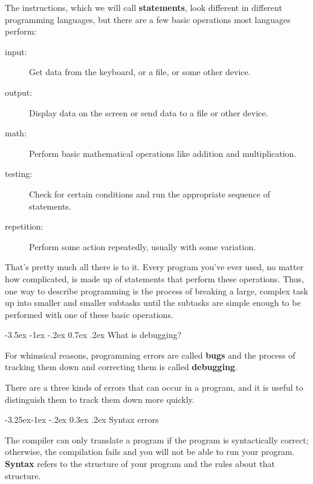 \documentclass{book}
\makeatletter
\renewcommand{\section}{\@startsection 
    {section} {1} {0mm}%
    {-3.5ex \@plus -1ex \@minus -.2ex}%
    {0.7ex \@plus.2ex}%
    {\normalfont\Large\bfseries}}
\renewcommand\subsection{\@startsection {subsection}{2}{0mm}%
    {-3.25ex\@plus -1ex \@minus -.2ex}%
    {0.3ex \@plus .2ex}%
    {\normalfont\large\bfseries}}
\makeatother
\begin{document}

The instructions, which we will call {\bf statements}, look different
in different programming languages, but there are a few basic
operations most languages perform:

\begin{description}

\item[input:] Get data from the keyboard, or a file, or some
other device.

\item[output:] Display data on the screen or send data to a
file or other device.

\item[math:] Perform basic mathematical operations like addition and
multiplication.

\item[testing:] Check for certain conditions and run the
appropriate sequence of statements.

\item[repetition:] Perform some action repeatedly, usually with
some variation.

\end{description}

That's pretty much all there is to it.
Every program you've ever used, no matter how complicated, is
made up of statements that perform these operations.  Thus,
one way to describe programming is the process of breaking a
large, complex task up into smaller and smaller subtasks
until the subtasks are simple enough to be performed
with one of these basic operations.


\section{What is debugging?}

For whimsical reasons,
programming errors are called {\bf bugs} and the process
of tracking them down and correcting them is called
{\bf debugging}.

There are a three kinds of errors that can occur
in a program, and it is useful to distinguish them
to track them down more quickly.

\subsection{Syntax errors}

The compiler can only translate a program if the program is
syntactically correct; otherwise, the compilation fails and
you will not be able to run your program.  {\bf Syntax}
refers to the structure of your program and the rules about
that structure.
\end{document}
